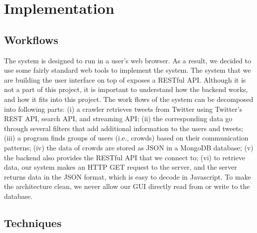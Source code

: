 \documentclass{sig-alternate}
\begin{document}
\begin{itemize}
%
\end{itemize}

\section{Implementation}

\subsection{Workflows}

The system is designed to run in a user's web browser. As a result, we decided
to use some fairly standard web tools to implement the system. The system that
we are building the user interface on top of exposes a RESTful API. Although
it is not a part of this project, it is important to understand how the backend
works, and how it fits into this project. The work flows of the system can be
decomposed into following parts: (i) a crawler retrieves tweets from Twitter using
Twitter's REST API, search API, and streaming API; (ii) the corresponding data
go through several filters that add additional information to the users and
tweets; (iii) a program finds groups of users (i.e., crowds) based on their 
communication patterns; (iv) the data of crowds are stored as JSON in a MongoDB
database; (v) the backend also provides the RESTful API that we connect to; (vi)
to retrieve data, our system makes an HTTP GET request to the server, and the 
server returns data in the JSON format, which is easy to decode in Javascript.
To make the architecture clean, we never allow our GUI directly read from or 
write to the database.

\subsection{Techniques}
\end{document}
